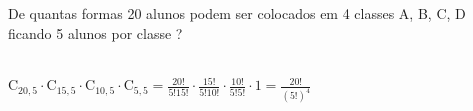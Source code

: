 \begin{ex}
 De quantas formas 20 alunos podem ser colocados em 4 classes A, B, C, D ficando 5 alunos por classe ?
  \begin{sol}
      \phantom{A} \\
  $\text{C}_{{20},5}\cdot\text{C}_{{15},5} \cdot\text{C}_{{10},5} \cdot\text{C}_{5,5}=\frac{20!}{5!15!}\cdot\frac{15!}{5!10!}\cdot\frac{10!}{5!5!}\cdot1=\frac{20!}{(5!)^4}$
  \end{sol}
\end{ex}